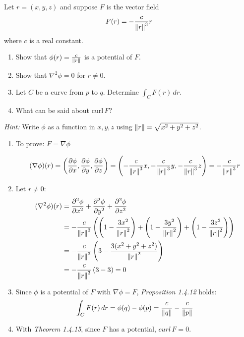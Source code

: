 \begin{exercise}
	Let $r = (x,y,z)$ and suppose $F$ is the vector field
	$$
		F(r) = - \frac{c}{\left\lVert r \right\rVert^3} r
	$$
	where $c$ is a real constant.
	\begin{enumerate}
		\item Show that $\phi(r) = \frac{c}{\left\lVert r \right\rVert}$ is a potential of $F$.

		\item Show that $\nabla^2 \phi = 0$ for $r \neq 0$.

		\item Let $C$ be a curve from $p$ to $q$. Determine $\int_C F(r) \, dr$.

		\item What can be said about $\mathrm{curl} \, F$?
	\end{enumerate}

	\emph{Hint:} Write $\phi$ as a function in $x, y, z$ using $\left\lVert r \right\rVert = \sqrt{x^2 + y^2 + z^2}$.
\end{exercise}

\begin{solution}
	\begin{enumerate}
		\item
		      To prove: $F = \nabla \phi$

		      $$
			      (\nabla \phi)(r) = \left( \frac{\partial \phi}{\partial x}, \frac{\partial \phi}{\partial y}, \frac{\partial \phi}{\partial z} \right)
			      = \left( -\frac{c}{\left\lVert r \right\rVert^3} x, -\frac{c}{\left\lVert r \right\rVert^3} y, -\frac{c}{\left\lVert r \right\rVert^3} z \right)
			      = - \frac{c}{\left\lVert r \right\rVert^3} r
		      $$

		\item Let $r \neq 0$:
		      $$
			      \begin{aligned}
				      (\nabla^2 \phi)(r) & = \frac{\partial^2 \phi}{\partial x^2} + \frac{\partial^2 \phi}{\partial y^2} + \frac{\partial^2 \phi}{\partial z^2}                                                     \\
				                         & = -\frac{c}{\left\lVert r \right\rVert^3} \left( \left(1 - \frac{3x^2}{\left\lVert r \right\rVert^2} \right) + \left(1 - \frac{3y^2}{\left\lVert r \right\rVert^2} \right) + \left(1 - \frac{3z^2}{\left\lVert r \right\rVert^2} \right) \right) \\
				                         & = -\frac{c}{\left\lVert r \right\rVert^3} \left( 3 - \frac{3(x^2+y^2+z^2)}{\left\lVert r \right\rVert^2} \right)                                                                                             \\
				                         & = -\frac{c}{\left\lVert r \right\rVert^3} \left( 3 - 3 \right) = 0
			      \end{aligned}
		      $$

		\item Since $\phi$ is a potential of $F$ with $\nabla \phi = F$, \emph{Proposition 1.4.12} holds:
		      $$
			      \int_C F(r) \, dr = \phi(q) - \phi(p) = \frac{c}{\left\lVert q \right\rVert} - \frac{c}{\left\lVert p \right\rVert}
		      $$

		\item With \emph{Theorem 1.4.15}, since $F$ has a potential, $curl \, F = 0$.
	\end{enumerate}
\end{solution}
